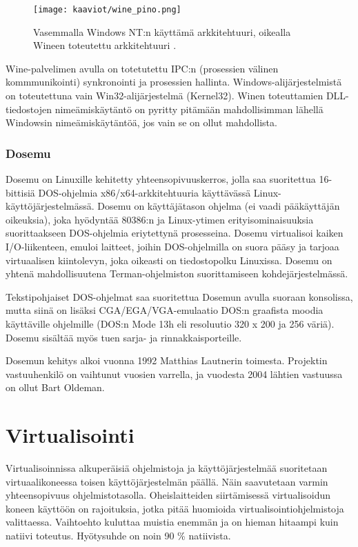 \begin{figure}[H]
\centering
\texttt{[image: kaaviot/wine\_pino.png]}
\caption{Vasemmalla Windows NT:n käyttämä arkkitehtuuri, oikealla Wineen toteutettu arkkitehtuuri \cite{wine:winnt_architecture,wine:architecture}. }
\label{wine_pino}
\end{figure}

Wine-palvelimen avulla on totetutettu IPC:n (prosessien välinen kommmunikointi) synkronointi ja prosessien hallinta. Windows-alijärjestelmistä on toteutettuna vain Win32-alijärjestelmä (Kernel32). Winen toteuttamien DLL-tiedostojen nimeämiskäytäntö on pyritty pitämään mahdollisimman lähellä Windowsin nimeämiskäytäntöä, jos vain se on ollut mahdollista. \citep{wine:architecture}

\subsubsection{Dosemu}
Dosemu on Linuxille kehitetty yhteensopivuuskerros, jolla saa suoritettua 16-bittisiä DOS-ohjelmia x86/x64-arkkitehtuuria käyttävässä Linux-käyttöjärjestelmässä. Dosemu on käyttäjätason ohjelma (ei vaadi pääkäyttäjän oikeuksia), joka hyödyntää 80386:n ja Linux-ytimen erityisominaisuuksia suorittaakseen DOS-ohjelmia eriytettynä prosesseina. Dosemu virtualisoi kaiken I/O-liikenteen, emuloi laitteet, joihin DOS-ohjelmilla on suora pääsy ja tarjoaa virtuaalisen kiintolevyn, joka oikeasti on tiedostopolku Linuxissa. Dosemu on yhtenä mahdollisuutena Terman-ohjelmiston suorittamiseen kohdejärjestelmässä.

Tekstipohjaiset DOS-ohjelmat saa suoritettua Dosemun avulla suoraan konsolissa, mutta siinä on lisäksi CGA/EGA/VGA-emulaatio DOS:n graafista moodia käyttäville ohjelmille (DOS:n Mode 13h eli resoluutio 320 x 200 ja 256 väriä). Dosemu sisältää myös tuen sarja- ja rinnakkaisporteille.

Dosemun kehitys alkoi vuonna 1992 Matthias Lautnerin toimesta. Projektin vastuuhenkilö on vaihtunut vuosien varrella, ja vuodesta 2004 lähtien vastuussa on ollut Bart Oldeman. \citep{dosemu:history}




\section{Virtualisointi}
Virtualisoinnissa alkuperäisiä ohjelmistoja ja käyttöjärjestelmää suoritetaan virtuaalikoneessa toisen käyttöjärjestelmän päällä. Näin saavutetaan varmin yhteensopivuus ohjelmistotasolla. Oheislaitteiden siirtämisessä virtualisoidun koneen käyttöön on rajoituksia, jotka pitää huomioida virtualisointiohjelmistoja valittaessa. Vaihtoehto kuluttaa muistia enemmän ja on hieman hitaampi kuin natiivi toteutus. Hyötysuhde on noin 90 \%  natiivista. \citep{virtnat_anadtech}

